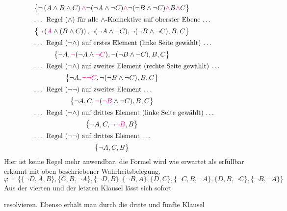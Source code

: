 \begin{gather*}
    \big\{ \neg \left( A \wedge B \wedge C \right) \cm{\wedge} \neg (\neg A \wedge \neg C) \cm{\wedge} \neg (\neg B
          \wedge \neg C) \cm{\wedge} B \cm{\wedge} C \big\} \\
\intertext{… Regel $(\wedge)$ für alle $\wedge$-Konnektive auf oberster Ebene …}
    \big\{ \cm{\neg} \left( \cm{A} \wedge (B \wedge C) \right), \neg (\neg A \wedge \neg C), \neg (\neg B \wedge \neg
          C), B, C \big\} \\
\intertext{… Regel $(\neg\wedge)$ auf erstes Element (linke Seite gewählt) …}
    \big\{ \neg A, \cm{\neg} (\neg A \wedge \cm{\neg C}), \neg (\neg B \wedge \neg C), B, C \big\} \\
\intertext{… Regel $(\neg\wedge)$ auf zweites Element (rechte Seite gewählt) …}
    \big\{ \neg A, \cm{\neg \neg C}, \neg (\neg B \wedge \neg C), B, C \big\} \\
\intertext{… Regel $(\neg\neg)$ auf zweites Element …}
    \big\{ \neg A, C, \cm{\neg} (\cm{\neg B} \wedge \neg C), B, C \big\} \\
\intertext{… Regel $(\neg\wedge)$ auf drittes Element (linke Seite gewählt) …}
    \big\{ \neg A, C, \cm{\neg \neg B}, B \big\} \\
\intertext{… Regel $(\neg\neg)$ auf drittes Element …}
    \big\{ \neg A, C, B \big\}
\end{gather*}
Hier ist keine Regel mehr anwendbar, die Formel wird wie erwartet als erfüllbar erkannt mit oben beschriebener
Wahrheitsbelegung.
\vspace{-2em}
\[
 \varphi = \big\{ \{\neg D, A, B\}, \{C, B, \neg A\}, \{\neg D, B\}, \{\neg B, A\}, \{D, C\}, \{\neg C, B, \neg A\},
            \{D, B, \neg C\}, \{\neg B, \neg A\} \big\}
\]
Aus der vierten und der letzten Klausel lässt sich sofort
\begin{prooftree}
\end{prooftree}
resolvieren. Ebenso erhält man durch die dritte und fünfte Klausel
\begin{prooftree}
\end{prooftree}
